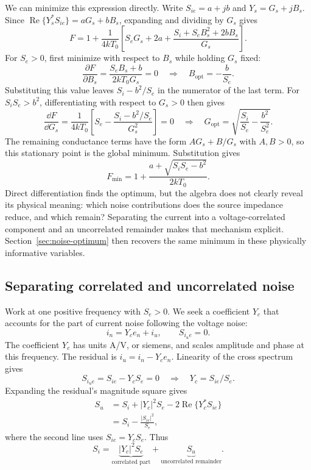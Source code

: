 We can minimize this expression directly. Write $S_{ie}=a+jb$ and $Y_s=G_s+jB_s$. Since $\operatorname{Re}\{Y_s^*S_{ie}\}=aG_s+bB_s$, expanding and dividing by $G_s$ gives
\[
F=1+\frac{1}{4kT_0}
\left[S_eG_s+2a+\frac{S_i+S_eB_s^2+2bB_s}{G_s}\right].
\]
For $S_e>0$, first minimize with respect to $B_s$ while holding $G_s$ fixed:
\[
\frac{\partial F}{\partial B_s}
=\frac{S_eB_s+b}{2kT_0G_s}=0
\quad\Longrightarrow\quad B_{\mathrm{opt}}=-\frac{b}{S_e}.
\]
Substituting this value leaves $S_i-b^2/S_e$ in the numerator of the last term. For $S_iS_e>b^2$, differentiating with respect to $G_s>0$ then gives
\[
\frac{\dd F}{\dd G_s}
=\frac{1}{4kT_0}\left[S_e-\frac{S_i-b^2/S_e}{G_s^2}\right]=0
\quad\Longrightarrow\quad
G_{\mathrm{opt}}=\sqrt{\frac{S_i}{S_e}-\frac{b^2}{S_e^2}}.
\]
The remaining conductance terms have the form $AG_s+B/G_s$ with $A,B>0$, so this stationary point is the global minimum. Substitution gives
\[
F_{\min}=1+\frac{a+\sqrt{S_iS_e-b^2}}{2kT_0}.
\]
Direct differentiation finds the optimum, but the algebra does not clearly reveal its physical meaning: which noise contributions does the source impedance reduce, and which remain? Separating the current into a voltage-correlated component and an uncorrelated remainder makes that mechanism explicit. Section~\ref{sec:noise-optimum} then recovers the same minimum in these physically informative variables.

\subsection{Separating correlated and uncorrelated noise}
Work at one positive frequency with $S_e>0$. We seek a coefficient $Y_c$ that accounts for the part of current noise following the voltage noise:
\[
i_n=Y_ce_n+i_u,\qquad S_{i_ue}=0.
\]
The coefficient $Y_c$ has units A/V, or siemens, and scales amplitude and phase at this frequency. The residual is $i_u=i_n-Y_ce_n$. Linearity of the cross spectrum gives
\[
S_{i_ue}=S_{ie}-Y_cS_e=0
\quad\Longrightarrow\quad \boxed{Y_c=S_{ie}/S_e.}
\]
Expanding the residual's magnitude square gives
\begin{align*}
S_u&=S_i+|Y_c|^2S_e-2\operatorname{Re}\{Y_c^*S_{ie}\}\\
&=S_i-\frac{|S_{ie}|^2}{S_e},
\end{align*}
where the second line uses $S_{ie}=Y_cS_e$. Thus
\[
S_i=\underbrace{|Y_c|^2S_e}_{\text{correlated part}}+
\underbrace{S_u}_{\text{uncorrelated remainder}}.
\]

\ProjectionFigure

